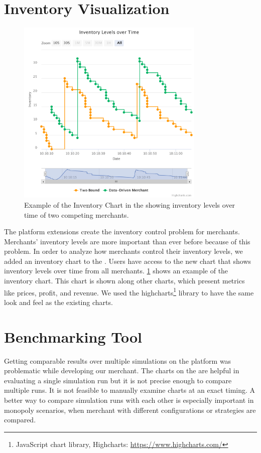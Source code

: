 \section{Inventory Visualization}
\label{section:inventory_graph}

\begin{figure}[t]
	\centering
	\includegraphics[width=0.8\textwidth]{figures/inventory_graph}
	\caption[Inventory Chart on the \UI]{Example of the Inventory Chart in the \ui showing inventory levels over time of two competing merchants.}
	\label{fig:invnetory_graph}
\end{figure}

The platform extensions create the inventory control problem for merchants.
Merchants' inventory levels are more important than ever before because of this problem.
In order to analyze how merchants control their inventory levels, we added an inventory chart to the \ui.
Users have access to the new chart that shows inventory levels over time from all merchants.
\cref{fig:invnetory_graph} shows an example of the inventory chart.
This chart is shown along other charts, which present metrics like prices, profit, and revenue. 
We used the highcharts\footnote{JavaScript chart library, Highcharts: \url{https://www.highcharts.com/}} library to have the same look and feel as the existing charts.

\section{Benchmarking Tool}
\label{section:benchmark_tool}
Getting comparable results over multiple simulations on the \pricewars platform was problematic while developing our merchant.
The charts on the \ui are helpful in evaluating a single simulation run but it is not precise enough to compare multiple runs.
It is not feasible to manually examine charts at an exact timing.
A better way to compare simulation runs with each other is especially important in monopoly scenarios, when merchant with different configurations or strategies are compared.

